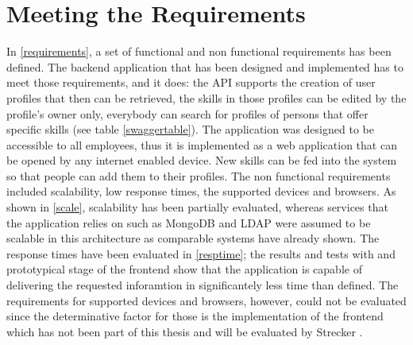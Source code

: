 \section{Meeting the Requirements}
In \ref{requirements}, a set of functional and non functional requirements has been defined. The backend application that has been designed and implemented has to meet those requirements, and it does: the API supports the creation of user profiles that then can be retrieved, the skills in those profiles can be edited by the profile's owner only, everybody can search for profiles of persons that offer specific skills (see table \ref{swaggertable}). The application was designed to be accessible to all employees, thus it is implemented as a web application that can be opened by any internet enabled device. New skills can be fed into the system so that people can add them to their profiles. \newline
The non functional requirements included scalability, low response times, the supported devices and browsers.
As shown in \ref{scale}, scalability has been partially evaluated, whereas services that the application relies on such as MongoDB and LDAP were assumed to be scalable in this architecture as comparable systems have already shown. The response times have been evaluated in \ref{resptime}; the results and tests with and prototypical stage of the frontend show that the application is capable of delivering the requested inforamtion in significantely less time than defined.
The requirements for supported devices and browsers, however, could not be evaluated since the determinative factor for those is the implementation of the frontend which has not been part of this thesis and will be evaluated by Strecker \cite{strecker}.
